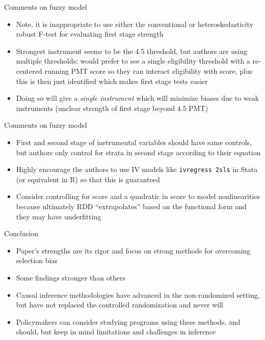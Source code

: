 \documentclass{beamer}
\begin{document}
\begin{frame}{Comments on fuzzy model}

\begin{itemize}
\item Note, it is inappropriate to use either the conventional or heteroskedasticity robust F-test for evaluating first stage strength
\item Strongest instrument seems to be the 4.5 threshold, but authors are using multiple thresholds; would prefer to see a single eligibility threshold with a re-centered running PMT score so they can interact eligibility with score, plus this is then just identified which makes first stage tests easier 
\item Doing so will give a \emph{single instrument} which will minimize biases due to weak instruments (unclear strength of first stage beyond 4.5 PMT)
\end{itemize}

\end{frame}

\begin{frame}{Comments on fuzzy model}

\begin{itemize}
\item First and second stage of instrumental variables should have same controls, but authors only control for strata in second stage according to their equation
\item Highly encourage the authors to use IV models like \texttt{ivregress 2sls} in Stata (or equivalent in R) so that this is guaranteed
\item Consider controlling for score and a quadratic in score to model nonlinearities because ultimately RDD ``extrapolates'' based on the functional form and they may have underfitting
\end{itemize}

\end{frame}


\begin{frame}{Conclusion}

\begin{itemize}
\item Paper's strengths are its rigor and focus on strong methods for overcoming selection bias
\item Some findings stronger than others
\item Causal inference methodologies have advanced in the non-randomized setting, but have not replaced the controlled randomization and never will
\item Policymakers can consider studying programs using these methods, and should, but keep in mind limitations and challenges in inference
\end{itemize}

\end{frame}
\end{document}
